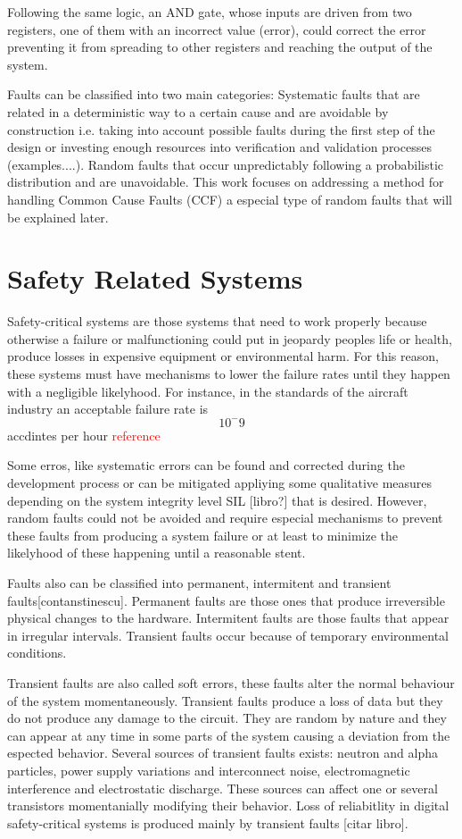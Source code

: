 Following the same logic, an AND gate, whose inputs are driven from two registers, one of them with an incorrect value (error), could correct the error preventing it from spreading to other registers and reaching the output of the system.

Faults can be classified into two main categories: Systematic faults that are related in a deterministic way to a certain cause and are avoidable by construction i.e. taking into account possible faults during the first step of the design or investing enough resources into verification and validation processes (examples....). Random faults that occur unpredictably following a probabilistic distribution and are unavoidable. This work focuses on addressing a method for handling Common Cause Faults (CCF) a especial type of random faults that will be explained later.


\section{Safety Related Systems}


Safety-critical systems are those systems that need to work properly because otherwise a failure or malfunctioning could put in jeopardy peoples life or health, produce losses in expensive equipment or environmental harm. For this reason, these systems must have mechanisms to lower the failure rates until they happen with a negligible likelyhood. For instance, in the standards of the aircraft industry an acceptable failure rate is \[10^-9\] accdintes per hour \textcolor{red}{reference}

Some erros, like systematic errors can be found and corrected during the development process or can be mitigated appliying some qualitative measures depending on the system integrity level SIL [libro?] that is desired. However, random faults could not be avoided and require especial mechanisms to prevent these faults from producing a system failure or at least to minimize the likelyhood of these happening until a reasonable stent.  

Faults also can be classified into permanent, intermitent and transient faults[contanstinescu]. Permanent faults are those ones that produce irreversible physical changes to the hardware. Intermitent faults are those faults that appear in irregular intervals. Transient faults occur because of temporary environmental conditions. 

Transient faults are also called soft errors, these faults alter the normal behaviour of the system momentaneously. Transient faults produce a loss of data but they do not produce any damage to the circuit. They are random by nature and they can appear at any time in some parts of the system causing a deviation from the espected behavior. Several sources of transient faults exists: neutron and alpha particles, power supply variations and interconnect noise, electromagnetic interference and electrostatic discharge. These sources can affect one or several transistors momentanially modifying their behavior. Loss of reliabitlity in digital safety-critical systems is produced mainly by transient faults [citar libro]. 

